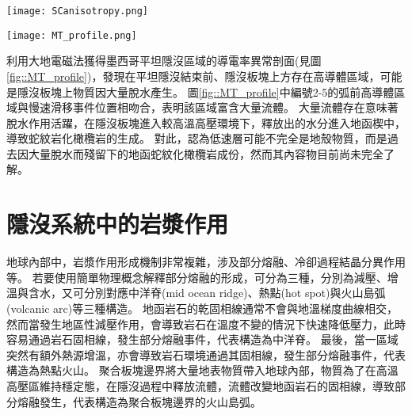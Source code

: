 \begin{figure*}[ht!]
    \centering
    \texttt{[image: SCanisotropy.png]}
    \caption[墨西哥隱沒帶板塊介面附近剪切帶結構示意圖，摘自\citealp{Song2012SC}]{墨西哥隱沒帶板塊介面附近剪切帶結構示意圖，摘自\citealp{Song2012SC}。大地震主要發生在鎖定區(locked zone)和脆性(brittle)變形區域。慢速滑移事件(slow-slip event)主要發生在過渡帶(transition zone)和半韌性區域(seni-ductile regime)，V$_S$非常低，且非均向性極強。岩石流變轉換由350$^{\circ}$等溫線(淺藍色線)分開，導致應力梯度形成且方向與黏土礦物中流體壓力相反，導致低速帶的形成。這些低速帶流體導致板塊介面處於弱耦合狀態，並且主導該地區慢速滑移事件的生成。
    }
    \label{fig::SCanisotorpy2012}
\end{figure*}


\begin{figure*}[ht!]
    \centering
    \texttt{[image: MT\_profile.png]}
    \caption[墨西哥平坦隱沒區域的導電率異常剖面圖與解釋圖，摘自\citealp{MT2006}]{墨西哥平坦隱沒區域的導電率異常剖面圖與解釋圖，摘自\citealp{MT2006}。上圖為電阻率異常結果剖面，所繪之隱沒板塊位置參考自\citealp{pardo1995}結果，最上方標示跨墨西哥火山帶的範圍。圖中每個數字圈皆代表隱沒帶上岩石發生相變後脫水的位置。下圖為電阻異常解釋圖，綠色區域為電阻異常低區(<100 $\Omega m$)。在平坦隱沒段結束處有多個岩石相變事件發生，隱沒板塊上出現大範圍導體。
    }
    \label{fig::MT_profile}
\end{figure*}

\citealp{MT2006}利用大地電磁法獲得墨西哥平坦隱沒區域的導電率異常剖面(見圖\ref{fig::MT_profile})，發現在平坦隱沒結束前、隱沒板塊上方存在高導體區域，可能是隱沒板塊上物質因大量脫水產生。
圖\ref{fig::MT_profile}中編號2-5的弧前高導體區域與慢速滑移事件位置相吻合，表明該區域富含大量流體。
大量流體存在意味著脫水作用活躍，在隱沒板塊進入較高溫高壓環境下，釋放出的水分進入地函楔中，導致蛇紋岩化橄欖岩的生成。
對此，\citealp{Manea2013}認為低速層可能不完全是地殼物質，而是過去因大量脫水而殘留下的地函蛇紋化橄欖岩成份，然而其內容物目前尚未完全了解。

\section{隱沒系統中的岩漿作用}\label{隱沒系統中的岩漿作用}
地球內部中，岩漿作用形成機制非常複雜，涉及部分熔融、冷卻過程結晶分異作用等。
若要使用簡單物理概念解釋部分熔融的形成，可分為三種，分別為減壓、增溫與含水，又可分別對應中洋脊(mid ocean ridge)、熱點(hot spot)與火山島弧(volcanic arc)等三種構造。
地函岩石的乾固相線通常不會與地溫梯度曲線相交，然而當發生地區性減壓作用，會導致岩石在溫度不變的情況下快速降低壓力，此時容易通過岩石固相線，發生部分熔融事件，代表構造為中洋脊。
最後，當一區域突然有額外熱源增溫，亦會導致岩石環境通過其固相線，發生部分熔融事件，代表構造為熱點火山。
聚合板塊邊界將大量地表物質帶入地球內部，物質為了在高溫高壓區維持穩定態，在隱沒過程中釋放流體，流體改變地函岩石的固相線，導致部分熔融發生，代表構造為聚合板塊邊界的火山島弧。

